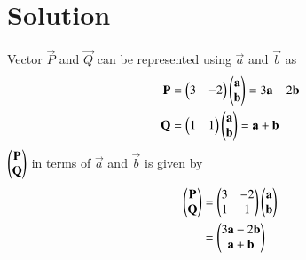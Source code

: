 \documentclass[journal,12pt,twocolumn]{IEEEtran}
\begin{document}
\section{Solution}
Vector $\vec{P}$ and $\vec{Q}$ can be represented using $\vec{a}$ and $\vec{b}$ as
\begin{align}
\mathbf{P} &= \begin{pmatrix}3&-2\end{pmatrix}\begin{pmatrix}\mathbf{a}\\\mathbf{b}\end{pmatrix} = 3\mathbf{a} - 2\mathbf{b}\\
\mathbf{Q} &= \begin{pmatrix}1&1\end{pmatrix}\begin{pmatrix}\mathbf{a}\\\mathbf{b}\end{pmatrix} = \mathbf{a} +\mathbf{b}
\end{align}
$\begin{pmatrix}\mathbf{P}\\\mathbf{Q}\end{pmatrix}$ in terms of $\vec{a}$ and $\vec{b}$ is given by
\begin{align}
\begin{pmatrix}\mathbf{P}\\\mathbf{Q}\end{pmatrix} &= \begin{pmatrix}3 & -2\\1 & 1\end{pmatrix}\begin{pmatrix}\mathbf{a} \\ \mathbf{b}\end{pmatrix}\\
&= \begin{pmatrix} 3\mathbf{a} - 2\mathbf{b} \\ \mathbf{a} +\mathbf{b}\end{pmatrix}
\end{align}
\end{document}
